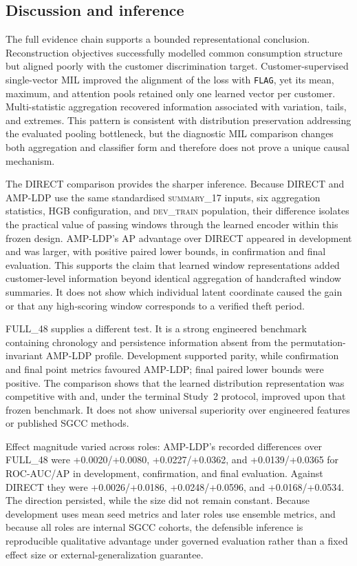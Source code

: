 \subsection{Discussion and inference}

The full evidence chain supports a bounded representational conclusion. Reconstruction objectives successfully modelled common consumption structure but aligned poorly with the customer discrimination target. Customer-supervised single-vector MIL improved the alignment of the loss with \texttt{FLAG}, yet its mean, maximum, and attention pools retained only one learned vector per customer. Multi-statistic aggregation recovered information associated with variation, tails, and extremes. This pattern is consistent with distribution preservation addressing the evaluated pooling bottleneck, but the diagnostic MIL comparison changes both aggregation and classifier form and therefore does not prove a unique causal mechanism.

The DIRECT comparison provides the sharper inference. Because DIRECT and AMP-LDP use the same standardised \textsc{summary\_17} inputs, six aggregation statistics, HGB configuration, and \textsc{dev\_train} population, their difference isolates the practical value of passing windows through the learned encoder within this frozen design. AMP-LDP's AP advantage over DIRECT appeared in development and was larger, with positive paired lower bounds, in confirmation and final evaluation. This supports the claim that learned window representations added customer-level information beyond identical aggregation of handcrafted window summaries. It does not show which individual latent coordinate caused the gain or that any high-scoring window corresponds to a verified theft period.

FULL\_48 supplies a different test. It is a strong engineered benchmark containing chronology and persistence information absent from the permutation-invariant AMP-LDP profile. Development supported parity, while confirmation and final point metrics favoured AMP-LDP; final paired lower bounds were positive. The comparison shows that the learned distribution representation was competitive with and, under the terminal Study~2 protocol, improved upon that frozen benchmark. It does not show universal superiority over engineered features or published SGCC methods.

Effect magnitude varied across roles: AMP-LDP's recorded differences over FULL\_48 were +0.0020/+0.0080, +0.0227/+0.0362, and +0.0139/+0.0365 for ROC-AUC/AP in development, confirmation, and final evaluation. Against DIRECT they were +0.0026/+0.0186, +0.0248/+0.0596, and +0.0168/+0.0534. The direction persisted, while the size did not remain constant. Because development uses mean seed metrics and later roles use ensemble metrics, and because all roles are internal SGCC cohorts, the defensible inference is reproducible qualitative advantage under governed evaluation rather than a fixed effect size or external-generalization guarantee.

